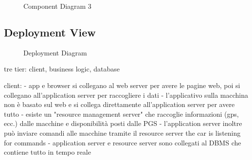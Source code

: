 \documentclass[english]{article}
\begin{document}
\begin{figure}[H]
	\centering
	\caption{Component Diagram 3}
	\label{componentdiagram3}
\end{figure}

\newpage
\subsection{Deployment View}

\begin{figure}[H]
	\centering
	\caption{Deployment Diagram}
	\label{deploymentdiagram}
\end{figure}

tre tier: client, business logic, database

client:
- app e browser si collegano al web server per avere le pagine web, poi si collegano all'application server per raccogliere i dati
- l'applicativo sulla macchina non è basato sul web e si collega direttamente all'application server per avere tutto
- esiste un "resource management server" che raccoglie informazioni (gps, ecc.) dalle macchine e disponibilità posti dalle PGS
- l'application server inoltre può inviare comandi alle macchine tramite il resource server
the car is listening for commands
- application server e resource server sono collegati al DBMS che contiene tutto in tempo reale
\end{document}

